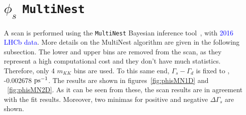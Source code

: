 \section{$\phi_s$ \texttt{MultiNest}} %
\label{sec:phisMULT}
A scan is performed using the \texttt{MultiNest} Bayesian inference tool~\cite{Feroz:2008xx}, with \textcolor{blue}{2016 LHCb data}. More details on the MultiNest algorithm are given in the following subsection. 
The lower and upper bins are removed from the scan, as they represent a high computational cost and they don't have much statistics. Therefore, only 4 $m_{KK}$ bins are used. To this same end, $\Gamma_s - \Gamma_d$ is fixed to , -0.002678 $\rm ps^{-1}$. 
The results are shown in figures~\ref{fig:phisMN1D} and ~\ref{fig:phisMN2D}. As it can be seen from these, the scan results are in agreement with the fit results. Moreover, two minimas for positive and negative $\Delta\Gamma_s$ are shown. 

